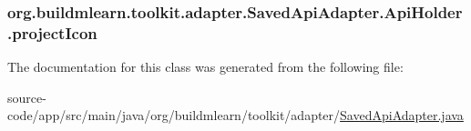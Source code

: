 \subsubsection[{\texorpdfstring{project\+Icon}{projectIcon}}]{ org.\+buildmlearn.\+toolkit.\+adapter.\+Saved\+Api\+Adapter.\+Api\+Holder.\+project\+Icon}\hypertarget{classorg_1_1buildmlearn_1_1toolkit_1_1adapter_1_1SavedApiAdapter_1_1ApiHolder_a640c4ad239571e3e2c86b82be9144470}{}\label{classorg_1_1buildmlearn_1_1toolkit_1_1adapter_1_1SavedApiAdapter_1_1ApiHolder_a640c4ad239571e3e2c86b82be9144470}


The documentation for this class was generated from the following file\+:\begin{DoxyCompactItemize}
\item 
source-\/code/app/src/main/java/org/buildmlearn/toolkit/adapter/\hyperlink{SavedApiAdapter_8java}{Saved\+Api\+Adapter.\+java}\end{DoxyCompactItemize}
